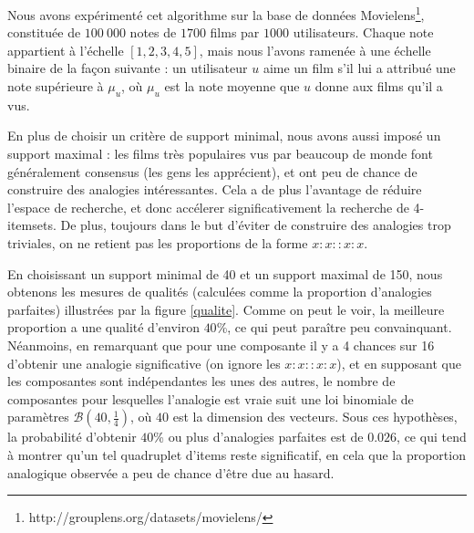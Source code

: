 Nous avons expérimenté cet algorithme sur la base de données
Movielens\footnote{http://grouplens.org/datasets/movielens/},
constituée de $100~000$ notes de $1700$ films par $1000$ utilisateurs. Chaque
note appartient à l'échelle $[1, 2, 3, 4, 5]$, mais nous l'avons ramenée à une
échelle binaire de la façon suivante : un utilisateur $u$ aime un film s'il lui
a attribué une note supérieure à $\mu_u$, où $\mu_u$ est la note moyenne que
$u$ donne aux films qu'il a vus.

En plus de choisir un critère de support minimal, nous avons aussi imposé un
support maximal : les films très populaires vus par beaucoup de monde font
généralement consensus (les gens les apprécient), et ont peu de chance de
construire des analogies intéressantes. Cela a de plus l'avantage de réduire
l'espace de recherche, et donc accélerer significativement la recherche de
4-itemsets. De plus, toujours dans le but d'éviter de construire des analogies
trop triviales, on ne retient pas les proportions de la forme $x:x::x:x$.

En choisissant un support minimal de 40 et un support maximal de 150, nous
obtenons les mesures de qualités (calculées comme la proportion d'analogies
parfaites) illustrées par la figure \ref{qualite}. Comme on peut le voir, la
meilleure proportion a une qualité d'environ $40$\%, ce qui peut paraître peu
convainquant. Néanmoins, en remarquant que pour une composante il y a 4 chances
sur 16 d'obtenir une analogie significative (on ignore les $x:x::x:x$), et en supposant que les composantes sont
indépendantes les unes des autres, le nombre de composantes pour lesquelles
l'analogie est vraie suit une loi binomiale de paramètres $\mathcal{B}(40,
\frac{1}{4})$, où $40$ est la dimension des vecteurs. Sous ces hypothèses, la
probabilité d'obtenir $40$\% ou plus d'analogies parfaites est de $0.026$, ce qui
tend à montrer qu'un tel quadruplet d'items reste significatif, en cela que la
proportion analogique observée a peu de chance d'être due au hasard.


